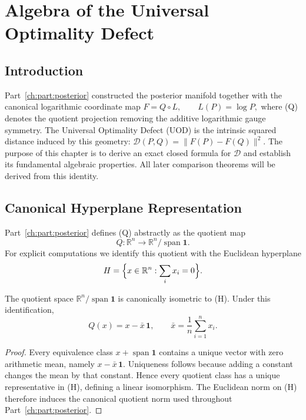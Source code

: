 \chapter[Algebra of the UOD]{Algebra of the Universal Optimality Defect}\label{ch:sec:algebra-of-the-universal-optimality-defect}
\section{Introduction}\label{ch:sec:introduction-analytic_uod-2}
Part~\ref{ch:part:posterior} constructed the posterior manifold together with the
canonical logarithmic coordinate map
$F = Q\circ L, \qquad L(P)=\log P,$
where (Q) denotes the quotient projection removing the additive
logarithmic gauge symmetry. The Universal Optimality Defect (UOD) is the
intrinsic squared distance induced by this geometry:
$\mathcal{D}(P,Q)=\|F(P)-F(Q)\|^{2}.$
The purpose of this chapter is to derive an exact closed formula for
\(\mathcal{D}\) and establish its fundamental algebraic properties.
All later comparison theorems will be derived from this identity.
\section{Canonical Hyperplane Representation}\label{ch:sec:canonical-hyperplane-representation}
Part~\ref{ch:part:posterior} defines (Q) abstractly as the quotient map
\[ Q:\mathbb{R}^{n}\rightarrow
\mathbb{R}^{n}/\operatorname{span}{\mathbf1}. \]
For explicit computations we identify this quotient with the Euclidean
hyperplane
\[ H=\Bigl\{x\in\mathbb{R}^{n}:\sum_{i}
x_i=0\Bigr\}. \]
\begin{lemma}
\label{ch:lem:21-1}
The quotient space
\(\mathbb{R}^{n}/\operatorname{span}{\mathbf1}\) is
canonically isometric to (H). Under this identification,
\[ Q(x)=x-\bar x\,\mathbf1, \qquad
\bar x=\frac1n\sum_{i=1}^{n} x_i. \]
\begin{proof}
Every equivalence class
\(x+\operatorname{span}{\mathbf1}\) contains a unique
vector with zero arithmetic mean, namely
\(x-\bar x\,\mathbf1\). Uniqueness follows because adding a
constant changes the mean by that constant. Hence every quotient class
has a unique representative in (H), defining a linear isomorphism. The
Euclidean norm on (H) therefore induces the canonical quotient norm used
throughout Part~\ref{ch:part:posterior}.
\end{proof}
\end{lemma}
